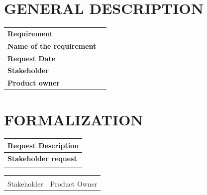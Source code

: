 \documentclass{article}
\begin{document}
	\section{GENERAL DESCRIPTION}
	
\begin{center}
	\begin{tabular}[t]{|p{4cm}|p{5cm}|p{5cm}| }
		\hline
		\rowcolor[HTML]{4F96C2} \multicolumn{3}{|c|}{\textbf{General Description}} \\
		\hline
		\cellcolor[HTML]{98B5C6} \textbf{Requirement} &
		\multicolumn{2}{p{10cm}|}{} \\
		\hline
		\cellcolor[HTML]{98B5C6} \textbf{Name of the requirement} &
		\multicolumn{2}{p{10cm}|}{} \\
		\hline
		\cellcolor[HTML]{98B5C6} \textbf{Request Date} &
		\multicolumn{2}{p{10cm}|}{} \\
		\hline
		\cellcolor[HTML]{98B5C6} \textbf{Stakeholder} &
		\multicolumn{2}{p{10cm}|}{} \\
		\hline
		\cellcolor[HTML]{98B5C6} \textbf{Product owner} &
		\multicolumn{2}{p{10cm}|}{} \\
		\hline
	\end{tabular}
\end{center}

\section{FORMALIZATION}

\begin{center}
	\begin{tabular}[t]{|p{17cm}| }
		\hline
		\rowcolor[HTML]{4F96C2} \textbf{Request Description}\\
		\hline
		\rowcolor[HTML]{98B5C6} \textbf{Stakeholder request}\\[0.03cm]
		\hline
		\textbf{}\\[5cm]
		\hline

	\end{tabular}
\end{center}

\begin{center}
	 
\end{center}

\vfill
\noindent\begin{tabular}{ll}
	\makebox[2.5in]{\hrulefill} & \makebox[2.5in]{\hrulefill}\\
	\hspace*{0mm}\phantom{Approved: }Stakeholder & \hspace*{0mm}\phantom{Approved: }Product Owner
\end{tabular}
%
%
\end{document}
